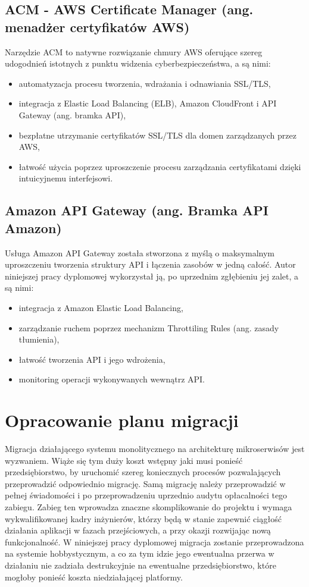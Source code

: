 \documentclass[12pt,twoside]{book}
\begin{document}
\subsection{ACM - AWS Certificate Manager (ang. menadżer certyfikatów AWS)}
Narzędzie ACM to natywne rozwiązanie chmury AWS oferujące szereg udogodnień istotnych z punktu widzenia cyberbezpieczeństwa, a są nimi:

\begin{itemize}
\item automatyzacja procesu tworzenia, wdrażania i odnawiania SSL/TLS,
\item integracja z Elastic Load Balancing (ELB), Amazon CloudFront i API Gateway (ang. bramka API),
\item bezpłatne utrzymanie certyfikatów SSL/TLS dla domen zarządzanych przez AWS,
\item łatwość użycia poprzez uproszczenie procesu zarządzania certyfikatami dzięki intuicyjnemu interfejsowi. \cite{aws.acm}
\end{itemize}

\subsection{Amazon API Gateway (ang. Bramka API Amazon)}
Usługa Amazon API Gateway została stworzona z myślą o maksymalnym uproszczeniu tworzenia struktury API i łączenia zasobów w jedną całość. Autor niniejszej pracy dyplomowej wykorzystał ją, po uprzednim zgłębieniu jej zalet, a są nimi:

\begin{itemize}
\item integracja z Amazon Elastic Load Balancing,
\item zarządzanie ruchem poprzez mechanizm Throttiling Rules (ang. zasady tłumienia),
\item łatwość tworzenia API i jego wdrożenia,
\item monitoring operacji wykonywanych wewnątrz API. \cite{aws.api.gateway}
\end{itemize}

\section{Opracowanie planu migracji}
Migracja działającego systemu monolitycznego na architekturę mikroserwisów jest wyzwaniem. Wiąże się tym duży koszt wstępny jaki musi ponieść przedsiębiorstwo, by uruchomić szereg koniecznych procesów pozwalających przeprowadzić odpowiednio migrację. Samą migrację należy przeprowadzić w pełnej świadomości i po przeprowadzeniu uprzednio audytu opłacalności tego zabiegu. Zabieg ten wprowadza znaczne skomplikowanie do projektu i wymaga wykwalifikowanej kadry inżynierów, którzy będą w stanie zapewnić ciągłość działania aplikacji w fazach przejściowych, a przy okazji rozwijając nową funkcjonalność.
W niniejszej pracy dyplomowej migracja zostanie przeprowadzona na systemie hobbystycznym, a co za tym idzie jego ewentualna przerwa w działaniu nie zadziała destrukcyjnie na ewentualne przedsiębiorstwo, które mogłoby ponieść koszta niedziałającej platformy. 
\end{document}
